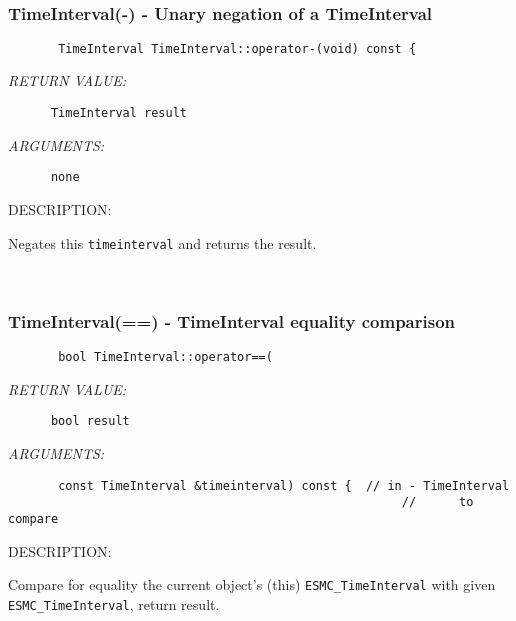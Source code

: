 \mbox{}\hrulefill\ 
 
\subsubsection [TimeInterval(-)] {TimeInterval(-) - Unary negation of a TimeInterval}


      
\begin{verbatim}       TimeInterval TimeInterval::operator-(void) const {
      \end{verbatim}{\em RETURN VALUE:}
\begin{verbatim}      TimeInterval result
      \end{verbatim}{\em ARGUMENTS:}
\begin{verbatim}      none\end{verbatim}
{\sf DESCRIPTION:\\ }


      Negates this {\tt timeinterval} and returns the result.
   
 
\mbox{}\hrulefill\ 
 
\subsubsection [TimeInterval(==)] {TimeInterval(==) - TimeInterval equality comparison}


  
\begin{verbatim}       bool TimeInterval::operator==(\end{verbatim}{\em RETURN VALUE:}
\begin{verbatim}      bool result\end{verbatim}{\em ARGUMENTS:}
\begin{verbatim}       const TimeInterval &timeinterval) const {  // in - TimeInterval
                                                       //      to compare\end{verbatim}
{\sf DESCRIPTION:\\ }


        Compare for equality the current object's (this)
        {\tt ESMC\_TimeInterval} with given {\tt ESMC\_TimeInterval},
        return result.
   
 
